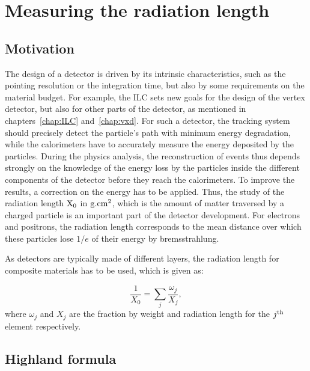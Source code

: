   \section{Measuring the radiation length}
  
    \subsection{Motivation}

    The design of a detector is driven by its intrinsic characteristics, such as the pointing resolution or the integration time, but also by some requirements on the material budget.
    For example, the \gls{ILC} sets new goals for the design of the vertex detector, but also for other parts of the detector, as mentioned in chapters~\ref{chap:ILC} and~\ref{chap:vxd}.
    For such a detector, the tracking system should precisely detect the particle's path with minimum energy degradation, while the calorimeters have to accurately measure the energy deposited by the particles.
    During the physics analysis, the reconstruction of events thus depends strongly on the knowledge of the energy loss by the particles inside the different components of the detector before they reach the calorimeters. 
    To improve the results, a correction on the energy has to be applied.
    Thus, the study of the radiation length $\rm{X_{0}}$ in $\rm{g.cm}^{2}$, which is the amount of matter traversed by a charged particle is an important part of the detector development.
    For electrons and positrons, the radiation length corresponds to the mean distance over which these particles lose $1/e$ of their energy by bremsstrahlung.

    As detectors are typically made of different layers, the radiation length for composite materials has to be used, which is given as:

    \begin{equation}
      \frac{1}{X_{0}} = \sum_{j} \frac{\omega_{j}}{X_{j}},
    \end{equation}
   where $\omega_{j}$ and $X_{j}$ are the fraction by weight and radiation length for the $j^{\rm{th}}$ element respectively.


    \subsection{Highland formula}
    
